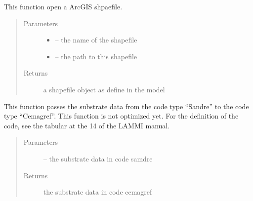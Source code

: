\documentclass[letterpaper,10pt,english]{sphinxmanual}
\begin{document}
\begin{fulllineitems}
\label{\detokenize{index:src.substrate.open_shp}}
This function open a ArcGIS shpaefile.
\begin{quote}\begin{description}
\item[{Parameters}] \leavevmode\begin{itemize}
\item {} 
 -- the name of the shapefile

\item {} 
 -- the path to this shapefile

\end{itemize}

\item[{Returns}] \leavevmode
a shapefile object as define in the model

\end{description}\end{quote}

\end{fulllineitems}


\begin{fulllineitems}
\label{\detokenize{index:src.substrate.sandre_to_cemagref}}
This function passes the substrate data from the code type ``Sandre'' to the code type ``Cemagref''. This function is
not optimized yet. For the definition of the code, see the tabular at the 14 of the LAMMI manual.
\begin{quote}\begin{description}
\item[{Parameters}] \leavevmode
{} -- the substrate data in code samdre

\item[{Returns}] \leavevmode
the substrate data in code cemagref

\end{description}\end{quote}

\end{fulllineitems}
\end{document}
